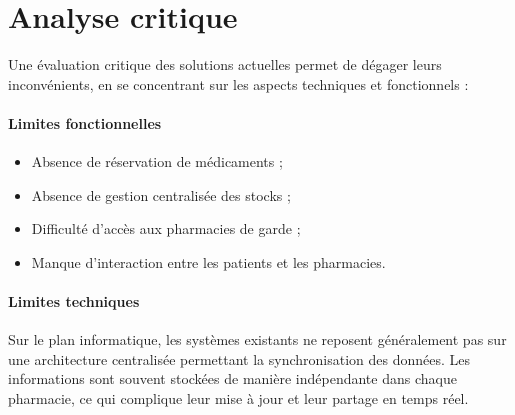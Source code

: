 \documentclass[12pt,a4paper]{report}
\begin{document}
	\section{Analyse critique} %
	Une évaluation critique des solutions actuelles permet de dégager leurs inconvénients, en se concentrant sur les aspects techniques et fonctionnels : %
	
	\paragraph{Limites fonctionnelles} %
	\begin{itemize} %
		\item Absence de réservation de médicaments ; %
		\item Absence de gestion centralisée des stocks ; %
		\item Difficulté d'accès aux pharmacies de garde ; %
		\item Manque d'interaction entre les patients et les pharmacies. %
	\end{itemize} %
	
	\paragraph{Limites techniques} %
	Sur le plan informatique, les systèmes existants ne reposent généralement pas sur une architecture centralisée permettant la synchronisation des données. %
	Les informations sont souvent stockées de manière indépendante dans chaque pharmacie, ce qui complique leur mise à jour et leur partage en temps réel. %
	
\end{document}
